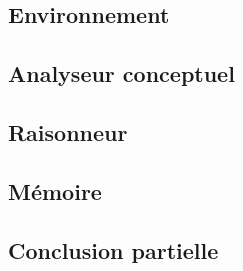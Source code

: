 \subsection{Environnement}


\subsection{Analyseur conceptuel}


\subsection{Raisonneur}


\subsection{Mémoire}


\subsection{Conclusion partielle}

